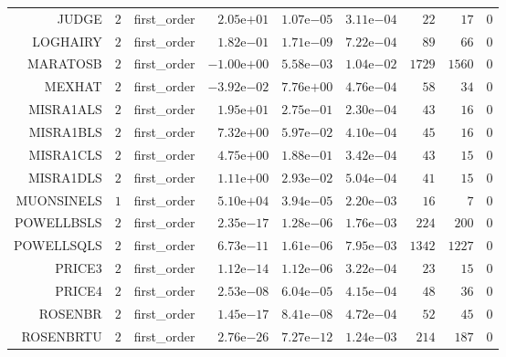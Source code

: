 \begin{longtable}{rrrrrrrrr}
JUDGE & \(     2\) & first\_order & \( 2.05\)e\(+01\) & \( 1.07\)e\(-05\) & \( 3.11\)e\(-04\) & \(    22\) & \(    17\) & \(     0\) \\
LOGHAIRY & \(     2\) & first\_order & \( 1.82\)e\(-01\) & \( 1.71\)e\(-09\) & \( 7.22\)e\(-04\) & \(    89\) & \(    66\) & \(     0\) \\
MARATOSB & \(     2\) & first\_order & \(-1.00\)e\(+00\) & \( 5.58\)e\(-03\) & \( 1.04\)e\(-02\) & \(  1729\) & \(  1560\) & \(     0\) \\
MEXHAT & \(     2\) & first\_order & \(-3.92\)e\(-02\) & \( 7.76\)e\(+00\) & \( 4.76\)e\(-04\) & \(    58\) & \(    34\) & \(     0\) \\
MISRA1ALS & \(     2\) & first\_order & \( 1.95\)e\(+01\) & \( 2.75\)e\(-01\) & \( 2.30\)e\(-04\) & \(    43\) & \(    16\) & \(     0\) \\
MISRA1BLS & \(     2\) & first\_order & \( 7.32\)e\(+00\) & \( 5.97\)e\(-02\) & \( 4.10\)e\(-04\) & \(    45\) & \(    16\) & \(     0\) \\
MISRA1CLS & \(     2\) & first\_order & \( 4.75\)e\(+00\) & \( 1.88\)e\(-01\) & \( 3.42\)e\(-04\) & \(    43\) & \(    15\) & \(     0\) \\
MISRA1DLS & \(     2\) & first\_order & \( 1.11\)e\(+00\) & \( 2.93\)e\(-02\) & \( 5.04\)e\(-04\) & \(    41\) & \(    15\) & \(     0\) \\
MUONSINELS & \(     1\) & first\_order & \( 5.10\)e\(+04\) & \( 3.94\)e\(-05\) & \( 2.20\)e\(-03\) & \(    16\) & \(     7\) & \(     0\) \\
POWELLBSLS & \(     2\) & first\_order & \( 2.35\)e\(-17\) & \( 1.28\)e\(-06\) & \( 1.76\)e\(-03\) & \(   224\) & \(   200\) & \(     0\) \\
POWELLSQLS & \(     2\) & first\_order & \( 6.73\)e\(-11\) & \( 1.61\)e\(-06\) & \( 7.95\)e\(-03\) & \(  1342\) & \(  1227\) & \(     0\) \\
PRICE3 & \(     2\) & first\_order & \( 1.12\)e\(-14\) & \( 1.12\)e\(-06\) & \( 3.22\)e\(-04\) & \(    23\) & \(    15\) & \(     0\) \\
PRICE4 & \(     2\) & first\_order & \( 2.53\)e\(-08\) & \( 6.04\)e\(-05\) & \( 4.15\)e\(-04\) & \(    48\) & \(    36\) & \(     0\) \\
ROSENBR & \(     2\) & first\_order & \( 1.45\)e\(-17\) & \( 8.41\)e\(-08\) & \( 4.72\)e\(-04\) & \(    52\) & \(    45\) & \(     0\) \\
ROSENBRTU & \(     2\) & first\_order & \( 2.76\)e\(-26\) & \( 7.27\)e\(-12\) & \( 1.24\)e\(-03\) & \(   214\) & \(   187\) & \(     0\) \\

\end{longtable}
